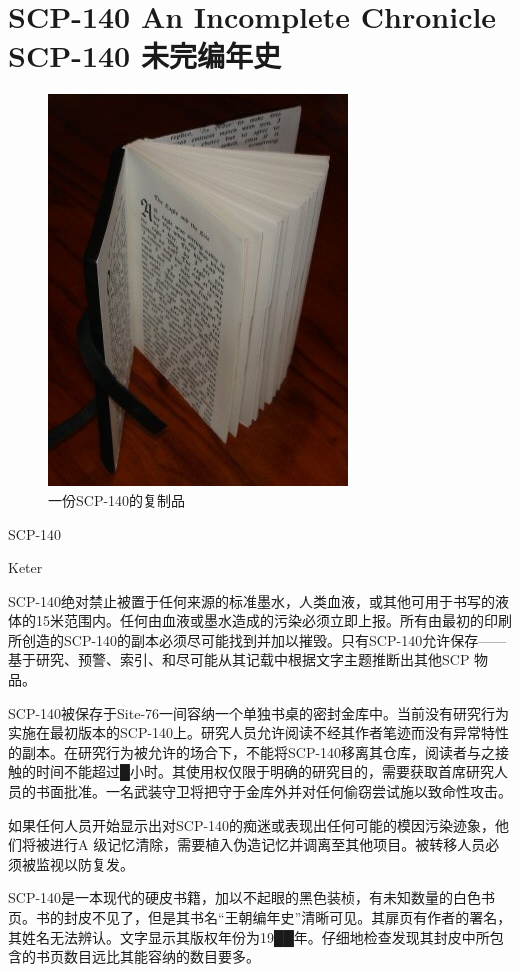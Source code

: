 \chapter[SCP-140 未完编年史]{
    SCP-140 An Incomplete Chronicle\\
    SCP-140 未完编年史
}

\label{chap:SCP-140}

\begin{figure}[H]
    \centering
    \includegraphics[width=0.5\linewidth]{images/SCP.140.jpg}
    \caption*{一份SCP-140的复制品}
\end{figure}

SCP-140

Keter

SCP-140绝对禁止被置于任何来源的标准墨水，人类血液，或其他可用于书写的液体的15米范围内。任何由血液或墨水造成的污染必须立即上报。所有由最初的印刷所创造的SCP-140的副本必须尽可能找到并加以摧毁。只有SCP-140允许保存——基于研究、预警、索引、和尽可能从其记载中根据文字主题推断出其他SCP 物品。

SCP-140被保存于Site-76一间容纳一个单独书桌的密封金库中。当前没有研究行为实施在最初版本的SCP-140上。研究人员允许阅读不经其作者笔迹而没有异常特性的副本。在研究行为被允许的场合下，不能将SCP-140移离其仓库，阅读者与之接触的时间不能超过█小时。其使用权仅限于明确的研究目的，需要获取首席研究人员的书面批准。一名武装守卫将把守于金库外并对任何偷窃尝试施以致命性攻击。

如果任何人员开始显示出对SCP-140的痴迷或表现出任何可能的模因污染迹象，他们将被进行A 级记忆清除，需要植入伪造记忆并调离至其他项目。被转移人员必须被监视以防复发。

SCP-140是一本现代的硬皮书籍，加以不起眼的黑色装桢，有未知数量的白色书页。书的封皮不见了，但是其书名“王朝编年史”清晰可见。其扉页有作者的署名，其姓名无法辨认。文字显示其版权年份为19██年。仔细地检查发现其封皮中所包含的书页数目远比其能容纳的数目要多。

